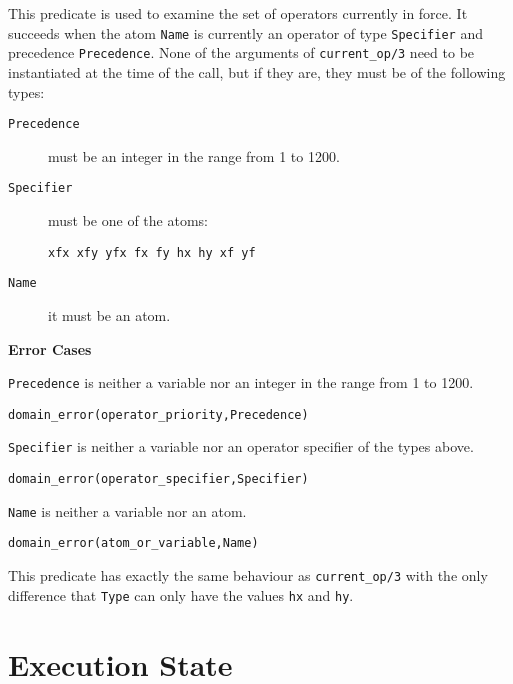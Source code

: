 \begin{description}

%
    This predicate is used to examine the set of operators currently
    in force.  It succeeds when the atom {\tt Name} is currently an
    operator of type {\tt Specifier} and precedence {\tt Precedence}.  None
    of the arguments of {\tt current\_op/3} need to be instantiated at
    the time of the call, but if they are, they must be of the
    following types: 
\begin{description}
\item[{\tt Precedence}] must be an integer in the range from 1 to 1200.  
\item[{\tt Specifier}] must be one of the atoms: 
\begin{verbatim} 
xfx xfy yfx fx fy hx hy xf yf 
\end{verbatim} 
\item[{\tt Name}] it must be an atom.
\end{description}

{\bf Error Cases}
\bi
\item 	{\tt Precedence} is neither a variable nor an integer in the
range from 1 to 1200. 
\bi
\item 	{\tt domain\_error(operator\_priority,Precedence)}
\ei
\item 	{\tt Specifier} is neither a variable nor an operator
specifier of the types above.
\bi
\item 	{\tt domain\_error(operator\_specifier,Specifier)}
\ei
\item 	{\tt Name} is neither a variable nor an atom.
\bi
\item 	{\tt domain\_error(atom\_or\_variable,Name)}
\ei
\ei

    This predicate has exactly the same behaviour as {\tt current\_op/3}
    with the only difference that {\tt Type} can only have the values
    {\tt hx} and {\tt hy}.
\end{description}




\section{Execution State}\label{environmental}

